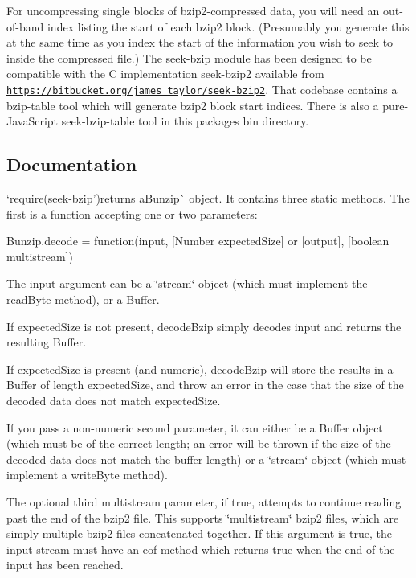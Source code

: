 For uncompressing single blocks of bzip2-\/compressed data, you will need an out-\/of-\/band index listing the start of each bzip2 block. (Presumably you generate this at the same time as you index the start of the information you wish to seek to inside the compressed file.) The {\ttfamily seek-\/bzip} module has been designed to be compatible with the C implementation {\ttfamily seek-\/bzip2} available from \href{https://bitbucket.org/james_taylor/seek-bzip2}{\tt https\+://bitbucket.\+org/james\+\_\+taylor/seek-\/bzip2}. That codebase contains a {\ttfamily bzip-\/table} tool which will generate bzip2 block start indices. There is also a pure-\/\+Java\+Script {\ttfamily seek-\/bzip-\/table} tool in this package\textquotesingle{}s {\ttfamily bin} directory.

\subsection*{Documentation}

`require(\textquotesingle{}seek-\/bzip'){\ttfamily returns a}Bunzip\`{} object. It contains three static methods. The first is a function accepting one or two parameters\+:

{\ttfamily Bunzip.\+decode = function(input, \mbox{[}\+Number expected\+Size\mbox{]} or \mbox{[}output\mbox{]}, \mbox{[}boolean multistream\mbox{]})}

The {\ttfamily input} argument can be a \char`\"{}stream\char`\"{} object (which must implement the {\ttfamily read\+Byte} method), or a {\ttfamily Buffer}.

If {\ttfamily expected\+Size} is not present, {\ttfamily decode\+Bzip} simply decodes {\ttfamily input} and returns the resulting {\ttfamily Buffer}.

If {\ttfamily expected\+Size} is present (and numeric), {\ttfamily decode\+Bzip} will store the results in a {\ttfamily Buffer} of length {\ttfamily expected\+Size}, and throw an error in the case that the size of the decoded data does not match {\ttfamily expected\+Size}.

If you pass a non-\/numeric second parameter, it can either be a {\ttfamily Buffer} object (which must be of the correct length; an error will be thrown if the size of the decoded data does not match the buffer length) or a \char`\"{}stream\char`\"{} object (which must implement a {\ttfamily write\+Byte} method).

The optional third {\ttfamily multistream} parameter, if true, attempts to continue reading past the end of the bzip2 file. This supports \char`\"{}multistream\char`\"{} bzip2 files, which are simply multiple bzip2 files concatenated together. If this argument is true, the input stream must have an {\ttfamily eof} method which returns true when the end of the input has been reached.

